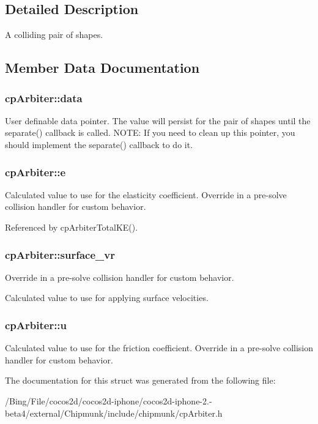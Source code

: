 \subsection{Detailed Description}
A colliding pair of shapes. 

\subsection{Member Data Documentation}
\hypertarget{structcp_arbiter_afb41ae8c3e4df711f47ab7ac3ef7ed9a}{
\subsubsection[{data}]{ {\bf cp\-Arbiter\-::data}}}\label{structcp_arbiter_afb41ae8c3e4df711f47ab7ac3ef7ed9a}
User definable data pointer. The value will persist for the pair of shapes until the separate() callback is called. N\-O\-T\-E\-: If you need to clean up this pointer, you should implement the separate() callback to do it. \hypertarget{structcp_arbiter_ae28e688fb03eba42a1dd786ab914c9eb}{
\subsubsection[{e}]{ {\bf cp\-Arbiter\-::e}}}\label{structcp_arbiter_ae28e688fb03eba42a1dd786ab914c9eb}
Calculated value to use for the elasticity coefficient. Override in a pre-\/solve collision handler for custom behavior. 

Referenced by cp\-Arbiter\-Total\-K\-E().

\hypertarget{structcp_arbiter_ad8724ab2c97ec732128fafc77668cc54}{
\subsubsection[{surface\-\_\-vr}]{ {\bf cp\-Arbiter\-::surface\-\_\-vr}}}\label{structcp_arbiter_ad8724ab2c97ec732128fafc77668cc54}


Override in a pre-\/solve collision handler for custom behavior. 

Calculated value to use for applying surface velocities. \hypertarget{structcp_arbiter_a1be4918be41986330005a6e745d013f3}{
\subsubsection[{u}]{ {\bf cp\-Arbiter\-::u}}}\label{structcp_arbiter_a1be4918be41986330005a6e745d013f3}
Calculated value to use for the friction coefficient. Override in a pre-\/solve collision handler for custom behavior. 

The documentation for this struct was generated from the following file\-:\begin{DoxyCompactItemize}
\item 
/\-Bing/\-File/cocos2d/cocos2d-\/iphone/cocos2d-\/iphone-\/2.-\/beta4/external/\-Chipmunk/include/chipmunk/cp\-Arbiter.\-h\end{DoxyCompactItemize}
